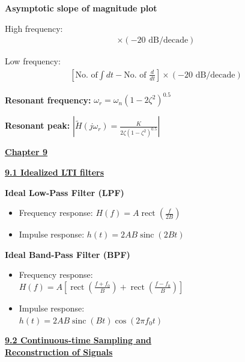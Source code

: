 \documentclass[landscape,a4paper]{extarticle}
\newenvironment{Figure}
  {\noindent\minipage{\linewidth}}
  {\endminipage\par\medskip}
\newcommand{\rect}[1]{\operatorname{rect}\left(#1\right)}
\newcommand{\sinc}[1]{\operatorname{sinc}\left(#1\right)}
\begin{document}
\begin{multicols*}{5}
    \textbf{Asymptotic slope of magnitude plot}

    High frequency:
    \begin{align*}
        [\text{Pole-zero excess}] \times (-20 \text{ dB/decade}) \tag{8.5a}
    \end{align*}

    Low frequency:
    \begin{align*}
        \left[\text{No. of} \int dt - \text{No. of } \frac{d}{dt}\right] \times (-20 \text{ dB/decade}) \tag{8.5a}
    \end{align*}

    \textbf{Resonant frequency: }$\omega_r = \omega_n(1 - 2 \zeta ^2)^{0.5}$

    \textbf{Resonant peak: }$\left|\tilde{H}(j \omega_r) = \frac{K}{2 \zeta (1 - \zeta^2)^{0.5}}\right|$

    \textbf{\uline{Chapter 9}}

    \textbf{\uline{9.1 Idealized LTI filters}}

    \textbf{Ideal Low-Pass Filter (LPF)}
    \begin{itemize}
        \item Frequency response: $H(f) = A\rect{\frac{f}{2B}}$
        \item Impulse response: $h(t) = 2AB\sinc{2Bt}$
    \end{itemize}


    \textbf{Ideal Band-Pass Filter (BPF)}
    \begin{itemize}
        \item Frequency response:\\
        $H(f) = A \left[\rect{\frac{f + f_0}{B}} + \rect{\frac{f - f_0}{B}}\right]$
        \item Impulse response:\\
        $h(t)=2AB\sinc{Bt}\cos{(2\pi f_0t)}$
    \end{itemize}


    \textbf{\uline{9.2 Continuous-time Sampling and\\Reconstruction of Signals}}


\end{multicols*}
\end{document}
